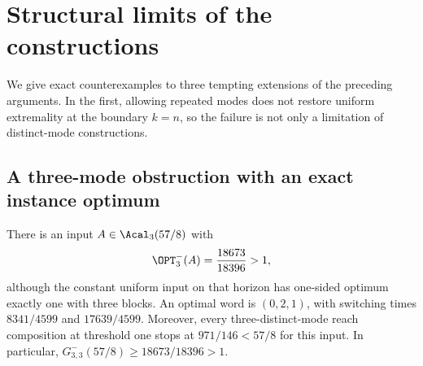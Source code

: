 \section{Structural limits of the constructions}\label{sec:structural-limits}

We give exact counterexamples to three tempting extensions of the
preceding arguments. In the first, allowing repeated modes does not restore
uniform extremality at the boundary $k=n$, so the failure is not only a
limitation of distinct-mode constructions.

\subsection{A three-mode obstruction with an exact instance optimum}

\begin{proposition}[Failure at $k=n=3$]\label{prop:three-mode-failure}
There is an input $A\in\Acal_3(57/8)$ with
\begin{equation}\label{eq:n3-exact-optimum}
 \OPT^-_3(A)=\frac{18673}{18396}>1,
\end{equation}
although the constant uniform input on that horizon has one-sided optimum
exactly one with three blocks. An optimal word is $(0,2,1)$, with switching
times $8341/4599$ and $17639/4599$. Moreover, every
three-distinct-mode reach composition at threshold one stops at
$971/146<57/8$ for this input. In particular,
$G^-_{3,3}(57/8)\ge18673/18396>1$.
\end{proposition}

